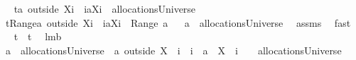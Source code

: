 \begin{isabellebody}
%
\isadelimproof
%
\endisadelimproof
%
\isatagproof
{}\isamarkupfalse%
\ {\isacharminus}\isanewline
{}\isamarkupfalse%
\ {\isacharquery}t{}{\isacharequal}{\isachardoublequoteopen}{\isacharparenleft}a\ outside\ {\isacharparenleft}X{\isasymunion}{\isacharbraceleft}i{\isacharbraceright}{\isacharparenright}{\isacharparenright}\ {\isasymunion}\ {\isacharparenleft}{\isacharbraceleft}i{\isacharbraceright}{\isasymtimes}{\isacharparenleft}{\isacharbraceleft}{\isasymUnion}{\isacharparenleft}a{\isacharbackquote}{\isacharbackquote}{\isacharparenleft}X{\isasymunion}{\isacharbraceleft}i{\isacharbraceright}{\isacharparenright}{\isacharparenright}{\isacharbraceright}{\isacharminus}{\isacharbraceleft}{\isacharbraceleft}{\isacharbraceright}{\isacharbraceright}{\isacharparenright}{\isacharparenright}\ {\isasymin}\ allocationsUniverse{\isachardoublequoteclose}\isanewline
{}\isamarkupfalse%
\ {\isacharquery}t{}{\isacharequal}{\isachardoublequoteopen}{\isasymUnion}{\isacharparenleft}Range{\isacharparenleft}{\isacharparenleft}a\ outside\ {\isacharparenleft}X{\isasymunion}{\isacharbraceleft}i{\isacharbraceright}{\isacharparenright}{\isacharparenright}\ {\isasymunion}\ {\isacharparenleft}{\isacharbraceleft}i{\isacharbraceright}{\isasymtimes}{\isacharparenleft}{\isacharbraceleft}{\isasymUnion}{\isacharparenleft}a{\isacharbackquote}{\isacharbackquote}{\isacharparenleft}X{\isasymunion}{\isacharbraceleft}i{\isacharbraceright}{\isacharparenright}{\isacharparenright}{\isacharbraceright}{\isacharminus}{\isacharbraceleft}{\isacharbraceleft}{\isacharbraceright}{\isacharbraceright}{\isacharparenright}{\isacharparenright}{\isacharparenright}{\isacharparenright}\ {\isacharequal}\ {\isasymUnion}{\isacharparenleft}Range\ a{\isacharparenright}{\isachardoublequoteclose}\isanewline
{}\isamarkupfalse%
\ \isanewline
{}{\isacharcolon}\ {\isachardoublequoteopen}a\ {\isasymin}\ allocationsUniverse{\isachardoublequoteclose}\ \isamarkupfalse%
\ assms{\isacharparenleft}{}{\isacharparenright}\ \isamarkupfalse%
\ fast\ \isanewline
{}\isamarkupfalse%
\ \isamarkupfalse%
\ {\isachardoublequoteopen}{\isacharquery}t{}\ {\isacharampersand}\ {\isacharquery}t{}{\isachardoublequoteclose}\ \isamarkupfalse%
\ lm{}{}b\ \isanewline
{}\isamarkupfalse%
\ {\isacharminus}\ \isanewline
\ \ \isamarkupfalse%
\ {\isachardoublequoteopen}a\ {\isasymin}\ allocationsUniverse\ {\isasymlongrightarrow}\ a\ outside\ {\isacharparenleft}X\ {\isasymunion}\ {\isacharbraceleft}i{\isacharbraceright}{\isacharparenright}\ {\isasymunion}\ {\isacharbraceleft}i{\isacharbraceright}\ {\isasymtimes}\ {\isacharparenleft}{\isacharbraceleft}{\isasymUnion}{\isacharparenleft}a\ {\isacharbackquote}{\isacharbackquote}\ {\isacharparenleft}X\ {\isasymunion}\ {\isacharbraceleft}i{\isacharbraceright}{\isacharparenright}{\isacharparenright}{\isacharbraceright}\ {\isacharminus}\ {\isacharbraceleft}{\isacharbraceleft}{\isacharbraceright}{\isacharbraceright}{\isacharparenright}\ {\isasymin}\ allocationsUniverse{\isachardoublequoteclose}\isanewline

\end{isabellebody}
